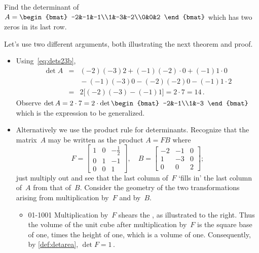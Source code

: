 \begin{example} 
Find the determinant of 
\(A=\begin{bmat} -2&-1&-1\\1&-3&-2\\0&0&2 \end{bmat}\)
which has two zeros in its last row.
\begin{solution} Let's use two different arguments, both illustrating the next theorem and proof.
\begin{itemize}
\item Using~\eqref{eq:dets23b},
\begin{eqnarray*}
\det A&=& (-2)(-3)2+(-1)(-2)\cdot0+(-1)1\cdot0
\\&&{}
-(-1)(-3)0-(-2)(-2)0-(-1)1\cdot2
\\&=&2\big[(-2)(-3)-(-1)1\big]=2\cdot7=14\,.
\end{eqnarray*}
Observe \(\det A=2\cdot7=2\cdot\det\begin{bmat} -2&-1\\1&-3 \end{bmat}\) which is the expression to be generalized.

\item Alternatively we use the product rule for determinants. Recognize that the matrix~\(A\) may be written as the product \(A=FB\) where
\begin{equation*}
F=\begin{bmatrix} 1&0&-\frac12\\0&1&-1\\0&0&1 \end{bmatrix},
\quad B=\begin{bmatrix} -2&-1&0\\1&-3&0\\0&0&2 \end{bmatrix};
\end{equation*}
just multiply out and see that the last column of~\(F\) `fills in' the last column of~\(A\) from that of~\(B\).
Consider the geometry of the two transformations arising from multiplication by~\(F\) and by~\(B\).
\begin{itemize}

\item 
\begin{figbox}{01{-1}001}%
Multiplication by~\(F\) shears the , as illustrated to the right.
Thus the volume of the unit cube after multiplication by~\(F\) is the square base of  one, times the height of one, which is a volume of one.
Consequently, by \cref{def:detarea}, \(\det F=1\)\,.
\end{figbox}



\end{itemize}
\end{itemize}
\end{solution}
\end{example}
